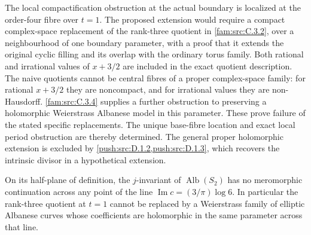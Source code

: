 \begin{remark}\label{fam:src:C.3.3}\label{fam:st:C.3.3}
The local compactification obstruction at the actual boundary is localized at the order-four fibre over $t=1$. The proposed extension would require a compact complex-space replacement of the rank-three
quotient in \ref{fam:src:C.3.2}, over a neighbourhood of one boundary parameter,
with a proof that it extends the original cyclic filling and its overlap
with the ordinary torus family. Both rational and irrational values of
$x+3/2$ are included in the exact quotient description. The naive
quotients cannot be central fibres of a proper complex-space family:
for rational $x+3/2$ they are noncompact, and for irrational values
they are non-Hausdorff. \ref{fam:src:C.3.4} supplies a further obstruction to preserving
a holomorphic Weierstrass Albanese model in this parameter.
These prove failure of the stated specific replacements. The unique base-fibre location and exact local period obstruction are thereby determined. The general proper holomorphic extension is excluded by \cref{push:src:D.1.2,push:src:D.1.3}, which recovers the intrinsic divisor in a hypothetical extension.
\end{remark}


\begin{proposition}\label{fam:src:C.3.4}\label{fam:st:C.3.4}
On its half-plane of definition, the $j$-invariant of
$\operatorname{Alb}(S_2)$ has no meromorphic continuation across any
point of the line
$\operatorname{Im}c=(3/\pi)\log6$. In particular the rank-three quotient
at $t=1$ cannot be replaced by a Weierstrass family of elliptic Albanese
curves whose coefficients are holomorphic in the same parameter across
that line.
\end{proposition}

